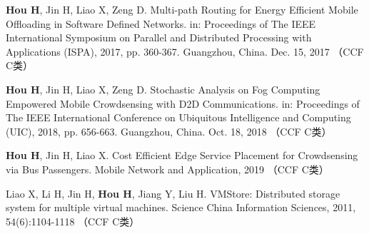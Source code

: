 \documentclass[format=draft,language=chinese,degree=phd,table,usenames,dvipsnames]{hustthesis}
\begin{document}
\begin{publications}
\item \textbf{Hou H}, Jin H, Liao X, Zeng D. Multi-path Routing for Energy Efficient Mobile Offloading in Software Defined Networks. in: Proceedings of The IEEE International Symposium on Parallel and Distributed Processing with Applications (ISPA), 2017, pp. 360-367. Guangzhou, China. Dec. 15, 2017 （CCF C类）
\item \textbf{Hou H}, Jin H, Liao X, Zeng D. Stochastic Analysis on Fog Computing Empowered Mobile Crowdsensing with D2D Communications. in: Proceedings of The IEEE International Conference on Ubiquitous Intelligence and Computing (UIC), 2018, pp. 656-663.  Guangzhou, China. Oct. 18, 2018 （CCF C类）
\item \textbf{Hou H}, Jin H, Liao X. Cost Efficient Edge Service Placement for Crowdsensing via Bus Passengers. Mobile Network and Application, 2019 （CCF C类）
\item Liao X, Li H, Jin H, \textbf{Hou H}, Jiang Y, Liu H. VMStore: Distributed storage system for multiple virtual machines. Science China Information Sciences, 2011, 54(6):1104-1118 （CCF C类）

\end{publications}
\end{document}

